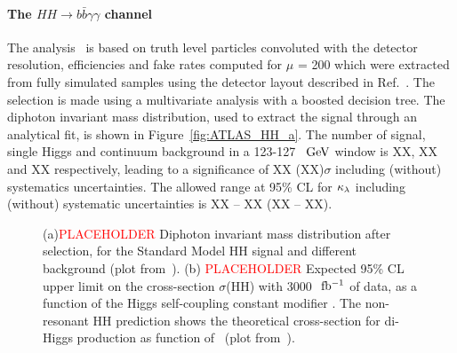 %
\paragraph{The $HH \rightarrow b\bar{b}\gamma\gamma$ channel}


The analysis~\cite{ATLASHHPUBnote} is based on truth level particles convoluted with the detector resolution, efficiencies and fake rates computed for $\mu$ = 200 which were extracted from fully simulated samples using the detector layout described in Ref.~\cite{ITKPixelTDR}. The selection is made using a multivariate analysis with a boosted decision tree. The diphoton invariant mass distribution, used to extract the signal through an analytical fit, is shown in Figure~\ref{fig:ATLAS_HH_a}. The number of signal, single Higgs and continuum background in a 123-127~$~\text{GeV}$ window is XX, XX and XX respectively, leading to a significance of XX (XX)$\sigma$ including (without) systematics uncertainties. The allowed range at 95\% CL for $\kappa_{\lambda}$ including (without) systematic uncertainties is XX -- XX (XX -- XX).


\begin{figure}[!htb]
\centering 
{} 
\caption{(a)\textcolor{red}{PLACEHOLDER} Diphoton invariant mass distribution after selection, for the Standard Model HH signal and different background (plot from~\cite{ITKPixelTDR}). (b) \textcolor{red}{PLACEHOLDER} Expected 95\% CL upper limit on the cross-section $\sigma$(HH) with 3000 $\rm~fb^{-1}$ of data, as a function of the Higgs self-coupling constant modifier \kl. The non-resonant HH prediction shows the theoretical cross-section for di-Higgs production as function of \kl\ (plot from~\cite{ITKPixelTDR}).} 
\label{fig:ATLAS_HH} 
\end{figure}


